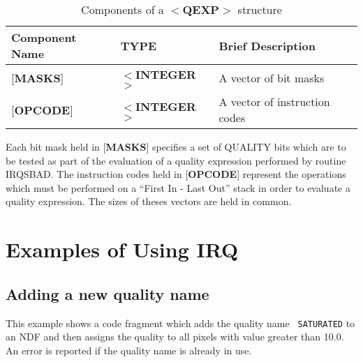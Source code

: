 \documentclass[twoside,11pt]{article}
\newcommand{\latex}[1]{#1}
\newcommand{\html}[1]{}
\renewcommand{\_}{\texttt{\symbol{95}}}
\begin{document}
\begin{table}[htb]
\centering
\latex{\caption{Components of a $<${\bf QEXP}$>$ structure}}
\html{\caption{{\bf 3:} Components of a $<${\bf QEXP}$>$ structure}}
\label{TAB:QEXP}
\begin{tabular}{|l|l|l|}
\hline
Component Name & TYPE & Brief Description \\ \hline
{[}{\bf MASKS}{]} & $<${\bf \_INTEGER}$>$ & A vector of bit masks\\
{[}{\bf OPCODE}{]} & $<${\bf \_INTEGER}$>$ & A vector of instruction codes\\
\hline
\end{tabular}
\end{table}

Each bit mask held in {[}{\bf MASKS}{]} specifies a set of QUALITY bits which
are to be tested as part of the evaluation of a quality expression performed by
routine IRQ\_SBAD. The instruction codes held in {[}{\bf OPCODE}{]} represent
the operations which must be performed on a ``First In - Last Out'' stack in
order to evaluate a quality expression. The sizes of theses vectors are held in
common. 

\newpage
\section {Examples of Using IRQ}
\label{APP:EXAMS}
\subsection {Adding a new quality name}

This example shows a code fragment which adds the quality name {\tt
SATURATED} to an NDF and then assigns the quality to all pixels with
value greater than 10.0. An error is reported if the quality name is
already in use.
\end{document}
